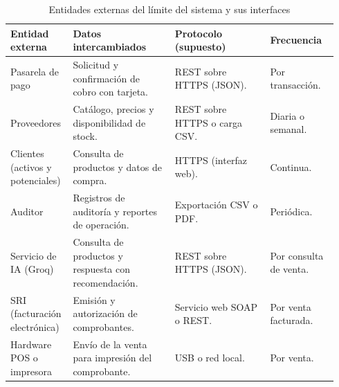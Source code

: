 \documentclass[onecolumn,12pt]{IEEEtran}
\begin{document}
\begin{table}[htbp]
\caption{Entidades externas del l\'imite del sistema y sus interfaces}
\label{tab:limite}
\centering
\footnotesize
\begin{tabular}{@{}p{0.16\linewidth}p{0.30\linewidth}p{0.28\linewidth}p{0.20\linewidth}@{}}
\toprule
\textbf{Entidad externa} & \textbf{Datos intercambiados} & \textbf{Protocolo (supuesto)} & \textbf{Frecuencia}\\
\midrule
Pasarela de pago & Solicitud y confirmaci\'on de cobro con tarjeta. & REST sobre HTTPS (JSON). & Por transacci\'on.\\
Proveedores & Cat\'alogo, precios y disponibilidad de stock. & REST sobre HTTPS o carga CSV. & Diaria o semanal.\\
Clientes (activos y potenciales) & Consulta de productos y datos de compra. & HTTPS (interfaz web). & Continua.\\
Auditor & Registros de auditor\'ia y reportes de operaci\'on. & Exportaci\'on CSV o PDF. & Peri\'odica.\\
Servicio de IA (Groq) & Consulta de productos y respuesta con recomendaci\'on. & REST sobre HTTPS (JSON). & Por consulta de venta.\\
SRI (facturaci\'on electr\'onica) & Emisi\'on y autorizaci\'on de comprobantes. & Servicio web SOAP o REST. & Por venta facturada.\\
Hardware POS o impresora & Env\'io de la venta para impresi\'on del comprobante. & USB o red local. & Por venta.\\
\bottomrule
\end{tabular}
\end{table}
\end{document}
